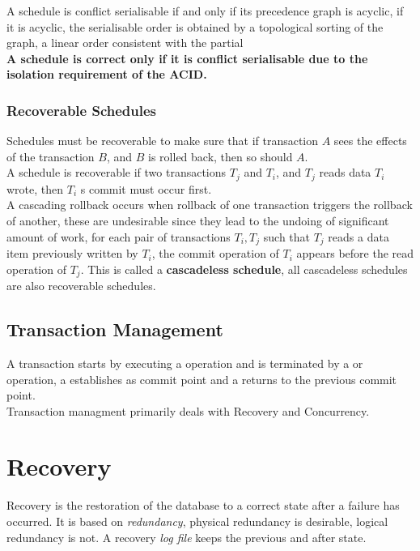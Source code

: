 \documentclass[11pt,a4paper,twocolumn]{book}
\begin{document}
A schedule is conflict serialisable if and only if its precedence graph is acyclic, if it is acyclic, the serialisable order is obtained by a topological sorting of the graph, a linear order consistent with the partial\\

\textbf{A schedule is correct only if it is conflict serialisable due to the isolation requirement of the ACID.}

\subsubsection{Recoverable Schedules}
Schedules must be recoverable to make sure that if transaction $A$ sees the effects of the transaction $B$, and $B$ is rolled back, then so should $A$.\\

A schedule is recoverable if two transactions $T_j$ and $T_i$, and $T_j$ reads data $T_i$ wrote, then $T_i$ s commit must occur first.\\

A cascading rollback occurs when rollback of one transaction triggers the rollback of another, these are undesirable since they lead to the undoing of significant amount of work, for each pair of transactions $T_i, T_j$ such that $T_j$ reads a data item previously written by $T_i$, the commit operation of $T_i$ appears before the read operation of $T_j$. This is called a \textbf{cascadeless schedule}, all cascadeless schedules are also recoverable schedules.

\subsection{Transaction Management}

A transaction starts by executing a  operation and is terminated by a  or  operation, a  establishes as commit point and a  returns to the previous commit point.\\

Transaction managment primarily deals with Recovery and Concurrency.

\section{Recovery}

Recovery is the restoration of the database to a correct state after a failure has occurred. It is based on \textit{redundancy}, physical redundancy is desirable, logical redundancy is not. A recovery \textit{log file} keeps the previous and after state.\\
\end{document}
